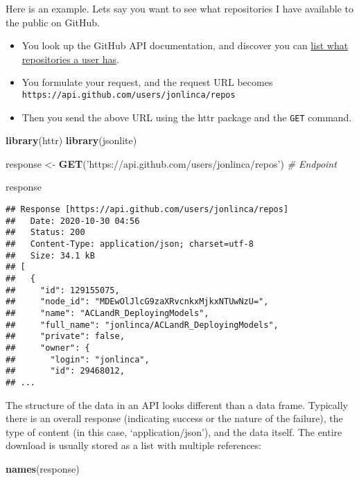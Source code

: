 \documentclass[
]{book}
\newenvironment{Shaded}{\begin{snugshade}}{\end{snugshade}}
\newcommand{\CommentTok}[1]{\textcolor[rgb]{0.56,0.35,0.01}{\textit{#1}}}
\newcommand{\KeywordTok}[1]{\textcolor[rgb]{0.13,0.29,0.53}{\textbf{#1}}}
\newcommand{\NormalTok}[1]{#1}
\newcommand{\StringTok}[1]{\textcolor[rgb]{0.31,0.60,0.02}{#1}}
\providecommand{\tightlist}{%
  \setlength{\itemsep}{0pt}\setlength{\parskip}{0pt}}
\begin{document}
Here is an example. Lets say you want to see what repositories I have available to the public on GitHub.

\begin{itemize}
\tightlist
\item
  You look up the GitHub API documentation, and discover you can \href{https://developer.github.com/v3/repos/\#list-repositories-for-a-user}{list what repositories a user has}.
\item
  You formulate your request, and the request URL becomes \texttt{https://api.github.com/users/jonlinca/repos}
\item
  Then you send the above URL using the httr package and the \texttt{GET} command.
\end{itemize}

\begin{Shaded}
\begin{Highlighting}[]
\KeywordTok{library}\NormalTok{(httr)}
\KeywordTok{library}\NormalTok{(jsonlite)}

\NormalTok{response <-}\StringTok{ }\KeywordTok{GET}\NormalTok{(}\StringTok{'https://api.github.com/users/jonlinca/repos'}\NormalTok{) }\CommentTok{# Endpoint}

\NormalTok{response}
\end{Highlighting}
\end{Shaded}

\begin{verbatim}
## Response [https://api.github.com/users/jonlinca/repos]
##   Date: 2020-10-30 04:56
##   Status: 200
##   Content-Type: application/json; charset=utf-8
##   Size: 34.1 kB
## [
##   {
##     "id": 129155075,
##     "node_id": "MDEwOlJlcG9zaXRvcnkxMjkxNTUwNzU=",
##     "name": "ACLandR_DeployingModels",
##     "full_name": "jonlinca/ACLandR_DeployingModels",
##     "private": false,
##     "owner": {
##       "login": "jonlinca",
##       "id": 29468012,
## ...
\end{verbatim}

The structure of the data in an API looks different than a data frame. Typically there is an overall response (indicating success or the nature of the failure), the type of content (in this case, `application/json'), and the data itself. The entire download is usually stored as a list with multiple references:

\begin{Shaded}
\begin{Highlighting}[]
\KeywordTok{names}\NormalTok{(response)}
\end{Highlighting}
\end{Shaded}
\end{document}
